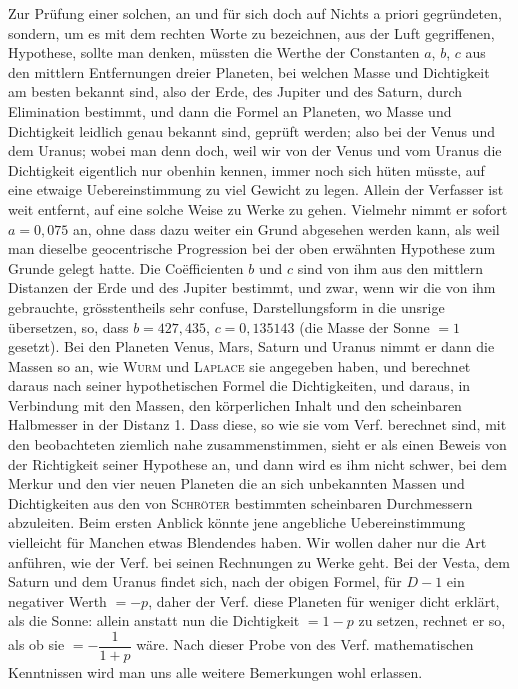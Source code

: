 Zur Prüfung einer solchen, an und für sich doch auf Nichts a priori gegründeten, sondern, um es mit dem rechten Worte zu bezeichnen, aus der Luft gegriffenen, Hypothese, sollte man denken, müssten die Werthe der Constanten $a$, $b$, $c$ aus den mittlern Entfernungen dreier Planeten, bei welchen Masse und Dichtigkeit am besten bekannt sind, also der Erde, des Jupiter und des Saturn, durch Elimination bestimmt, und dann die Formel an Planeten, wo Masse und Dichtigkeit leidlich genau bekannt sind, geprüft werden; also bei der Venus und dem Uranus; wobei man denn doch, weil wir von der Venus und vom Uranus die Dichtigkeit eigentlich nur obenhin kennen, immer noch sich hüten müsste, auf eine etwaige Uebereinstimmung zu viel Gewicht zu legen. Allein der Verfasser ist weit entfernt, auf eine solche Weise zu Werke zu gehen. Vielmehr nimmt er sofort $a = \mathrm{0{,}075}$ an, ohne dass dazu weiter ein Grund abgesehen werden kann, als weil man dieselbe geocentrische Progression bei der oben erwähnten Hypothese zum Grunde gelegt hatte. Die Coëfficienten $b$ und $c$ sind von ihm aus den mittlern Distanzen der Erde und des Jupiter bestimmt, und zwar, wenn wir die von ihm gebrauchte, grösstentheils sehr confuse, Darstellungsform in die unsrige übersetzen, so, dass $b = \mathrm{427{,}435}$, $c = \mathrm{0{,}135143}$ (die Masse der Sonne $= \mathrm{1}$ gesetzt). Bei den Planeten Venus, Mars, Saturn und Uranus nimmt er dann die Massen so an, wie \textsc{Wurm} und \textsc{Laplace} sie angegeben haben, und berechnet daraus nach seiner hypothetischen Formel die Dichtigkeiten, und daraus, in Verbindung mit den Massen, den körperlichen Inhalt und den scheinbaren Halbmesser in der Distanz 1. Dass diese, so wie sie vom Verf. berechnet sind, mit den beobachteten ziemlich nahe zusammenstimmen, sieht er als einen Beweis von der Richtigkeit seiner Hypothese an, und dann wird es ihm nicht schwer, bei dem Merkur und den vier neuen Planeten die an sich unbekannten Massen und Dichtigkeiten aus den von \textsc{Schröter} bestimmten scheinbaren Durchmessern abzuleiten. Beim ersten Anblick könnte jene angebliche Uebereinstimmung vielleicht für Manchen etwas Blendendes haben. Wir wollen daher nur die Art anführen, wie der Verf. bei seinen Rechnungen zu Werke geht. Bei der Vesta, dem Saturn und dem Uranus findet sich, nach der obigen Formel, für $D - \mathrm{1}$ ein negativer Werth $= -p$, daher der Verf. diese Planeten für weniger dicht erklärt, als die Sonne: allein anstatt nun die Dichtigkeit $= \mathrm{1} - p$ zu setzen, rechnet er so, als ob sie $= -\dfrac{1}{1+p}$ wäre. Nach dieser Probe von des Verf. mathematischen Kenntnissen wird man uns alle weitere Bemerkungen wohl erlassen.


